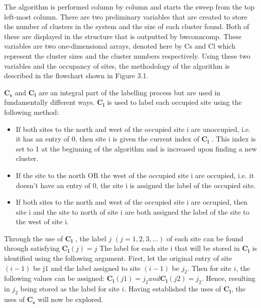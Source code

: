 The algorithm is performed column by column and starts the sweep from the top left-most column. 
There are two preliminary variables that are created to store the number of clusters in the system and the size of each cluster found. 
Both of these are displayed in the structure that is outputted by bwconncomp. 
These variables are two one-dimensional arrays, denoted here by Cs and Cl which represent the cluster sizes and the cluster numbers respectively. 
Using these two variables and the occupancy of sites, the methodology of the algorithm is described in the flowchart shown in Figure 3.1.

$\mathbf{C_s}$ and $\mathbf{C_l}$ are an integral part of the labelling process but are used in fundamentally different ways.
$\mathbf{C_l}$ is used to label each occupied site using the following method:

\begin{itemize}
    \item If both sites to the north and west of the occupied site i are unoccupied, 
    i.e. it has an entry of 0, then site i is given the current index of $\mathbf{C_l}$ . 
    This index is set to 1 at the beginning of the algorithm and is increased upon finding a new cluster.
    \item If the site to the north OR the west of the occupied site i are occupied, i.e. 
    it doesn’t have an entry of 0, the site i is assigned the label of the occupied site.
    \item If both sites to the north and west of the occupied site i are occupied, then site i and the site to north of site 
    i are both assigned the label of the site to the west of site i.
\end{itemize}

Through the use of $\mathbf{C_l}$ , the label $j$ $(j = 1,2,3,...)$ of each site can be found through satisfying $\mathbf{C_l}(j) = j$ 
The label for each site i that will be stored in $\mathbf{C_l}$ is identified using the following argument. 
First, let the original entry of site $(i − 1)$ be j1 and the label assigned to site $(i − 1)$ be $j_2$. 
Then for site $i$, the following values can be assigned: $\mathbf{C_l}(j1) = j_2 and \mathbf{C_l}(j2) = j_2$.
Hence, resulting in $j_2$ being stored as the label for site $i$. Having established the uses of $\mathbf{C_l}$, the uses of $\mathbf{C_s}$ will now be explored.

